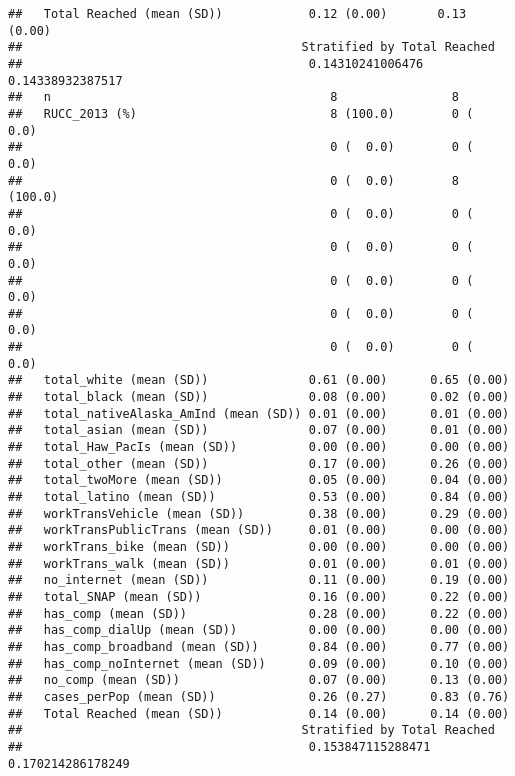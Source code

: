 \documentclass[
]{article}
\begin{document}
\begin{verbatim}
##   Total Reached (mean (SD))            0.12 (0.00)       0.13 (0.00)      
##                                       Stratified by Total Reached
##                                        0.14310241006476 0.14338932387517
##   n                                       8                8            
##   RUCC_2013 (%)                           8 (100.0)        0 (  0.0)    
##                                           0 (  0.0)        0 (  0.0)    
##                                           0 (  0.0)        8 (100.0)    
##                                           0 (  0.0)        0 (  0.0)    
##                                           0 (  0.0)        0 (  0.0)    
##                                           0 (  0.0)        0 (  0.0)    
##                                           0 (  0.0)        0 (  0.0)    
##                                           0 (  0.0)        0 (  0.0)    
##   total_white (mean (SD))              0.61 (0.00)      0.65 (0.00)     
##   total_black (mean (SD))              0.08 (0.00)      0.02 (0.00)     
##   total_nativeAlaska_AmInd (mean (SD)) 0.01 (0.00)      0.01 (0.00)     
##   total_asian (mean (SD))              0.07 (0.00)      0.01 (0.00)     
##   total_Haw_PacIs (mean (SD))          0.00 (0.00)      0.00 (0.00)     
##   total_other (mean (SD))              0.17 (0.00)      0.26 (0.00)     
##   total_twoMore (mean (SD))            0.05 (0.00)      0.04 (0.00)     
##   total_latino (mean (SD))             0.53 (0.00)      0.84 (0.00)     
##   workTransVehicle (mean (SD))         0.38 (0.00)      0.29 (0.00)     
##   workTransPublicTrans (mean (SD))     0.01 (0.00)      0.00 (0.00)     
##   workTrans_bike (mean (SD))           0.00 (0.00)      0.00 (0.00)     
##   workTrans_walk (mean (SD))           0.01 (0.00)      0.01 (0.00)     
##   no_internet (mean (SD))              0.11 (0.00)      0.19 (0.00)     
##   total_SNAP (mean (SD))               0.16 (0.00)      0.22 (0.00)     
##   has_comp (mean (SD))                 0.28 (0.00)      0.22 (0.00)     
##   has_comp_dialUp (mean (SD))          0.00 (0.00)      0.00 (0.00)     
##   has_comp_broadband (mean (SD))       0.84 (0.00)      0.77 (0.00)     
##   has_comp_noInternet (mean (SD))      0.09 (0.00)      0.10 (0.00)     
##   no_comp (mean (SD))                  0.07 (0.00)      0.13 (0.00)     
##   cases_perPop (mean (SD))             0.26 (0.27)      0.83 (0.76)     
##   Total Reached (mean (SD))            0.14 (0.00)      0.14 (0.00)     
##                                       Stratified by Total Reached
##                                        0.153847115288471 0.170214286178249

\end{verbatim}
\end{document}
